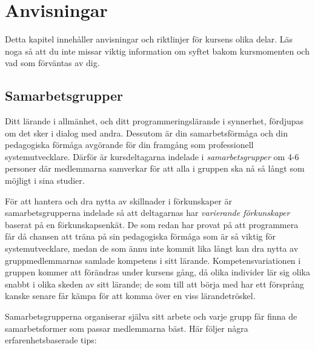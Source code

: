 
\chapter{Anvisningar}

Detta kapitel innehåller anvisningar och riktlinjer för kursens olika delar. Läs noga så att du inte missar viktig information om syftet bakom kursmomenten och vad som förväntas av dig.

\section{Samarbetsgrupper}

Ditt lärande i allmänhet, och ditt programmeringslärande i synnerhet, fördjupas om det sker i dialog med andra. Dessutom är din samarbetsförmåga och din pedagogiska förmåga avgörande för din framgång som professionell systemutvecklare. Därför är kursdeltagarna indelade i \emph{samarbetsgrupper} om 4-6 personer där medlemmarna samverkar för att alla i gruppen ska nå så långt som möjligt i sina studier.

För att hantera och dra nytta av skillnader i förkunskaper är samarbetsgrupperna indelade så att deltagarnas har \emph{varierande förkunskaper} baserat på en förkunskapsenkät. De som redan har provat på att programmera får då chansen att träna på sin pedagogiska förmåga som är så viktig för systemutvecklare, medan de som ännu inte kommit lika långt kan dra nytta av gruppmedlemmarnas samlade kompetens i sitt lärande. Kompetensvariationen i gruppen kommer att förändras under kursens gång, då olika individer lär sig olika snabbt i olika skeden av sitt lärande; de som till att börja med har ett försprång kanske senare får kämpa för att komma över en viss lärandetröskel.

Samarbetsgrupperna organiserar själva sitt arbete och varje grupp får finna de samarbetsformer som passar medlemmarna bäst. Här följer några erfarenhetsbaserade tips:

